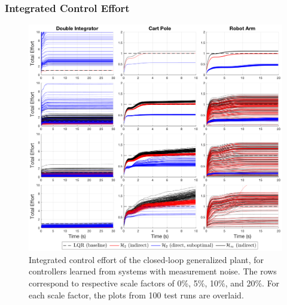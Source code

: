 \subsubsection{Integrated Control Effort}
\begin{figure}[H]
\centering
	\includegraphics[width=\textwidth]{figures/noise_integrated_effort4_s.png}
\caption{Integrated control effort of the closed-loop generalized plant, for controllers learned from systems with measurement noise.  The rows correspond to respective scale factors of 0\%, 5\%, 10\%, and 20\%.  For each scale factor, the plots from 100 test runs are overlaid.}
\label{fig:noise_integrated_effort4_s}
\end{figure}

\newpage
